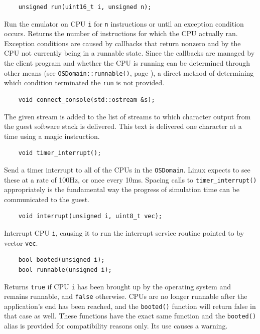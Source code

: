 \documentclass[letterpaper, 10pt]{book}
\begin{document}
\label{func:run} \begin{verbatim}
    unsigned run(uint16_t i, unsigned n);
\end{verbatim}
Run the emulator on CPU \texttt{i} for \texttt{n} instructions or until an
exception condition occurs. Returns the number of instructions for which the
CPU actually ran. Exception conditions are caused by callbacks that return
nonzero and by the CPU not currently being in a runnable state. Since the
callbacks are managed by the client program and whether the CPU is running
can be determined through other means (see \texttt{OSDomain::runnable()}, page 
\pageref{func:runnable}), a direct method of determining which condition
terminated the \texttt{run} is not provided.

\label{func:connect_console} \begin{verbatim}
    void connect_console(std::ostream &s);
\end{verbatim}
The given stream is added to the list of streams to which character output from
the guest software stack is delivered. This text is delivered one character at
a time using a magic instruction.

\label{func:timer_interrupt} \begin{verbatim}
    void timer_interrupt();
\end{verbatim}
Send a timer interrupt to all of the CPUs in the \texttt{OSDomain}. Linux
expects to see these at a rate of 100Hz, or once every 10ms. Spacing calls to
\texttt{timer\_interrupt()} appropriately is the fundamental way the progress
of simulation time can be communicated to the guest.

\label{func:interrupt} \begin{verbatim}
    void interrupt(unsigned i, uint8_t vec);
\end{verbatim}
Interrupt CPU \texttt{i}, causing it to run the interrupt service routine
pointed to by vector \texttt{vec}.

\label{func:booted} \label{func:runnable} \begin{verbatim}
    bool booted(unsigned i);
    bool runnable(unsigned i);
\end{verbatim}
Returns \texttt{true} if CPU \texttt{i} has been brought up by the operating
system and remains runnable, and \texttt{false} otherwise. CPUs are no longer
runnable after the application's end has been reached, and the
\texttt{booted()} function will return false in that case as well. These
functions have the exact same function and the \texttt{booted()} alias is
provided for compatibility reasons only. Its use causes a warning.
\end{document}
